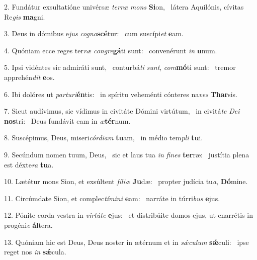 2. Fundátur exsultatióne univérsæ \textit{ter}\textit{ræ} \textit{mons} \textbf{Si}on, \ast\  látera Aquilónis, cívitas Re\textit{gis} \textbf{ma}gni.\

3. Deus in dómibus e\textit{jus} \textit{co}\textit{gno}\textbf{scé}tur: \ast\  cum suscípi\textit{et} \textbf{e}am.\

4. Quóniam ecce reges ter\textit{ræ} \textit{con}\textit{gre}\textbf{gá}ti sunt: \ast\  convenérunt \textit{in} \textbf{u}num.\

5. Ipsi vidéntes sic admiráti sunt, \dag\  conturbá\textit{ti} \textit{sunt}, \textit{com}\textbf{mó}ti sunt: \ast\  tremor apprehén\textit{dit} \textbf{e}os.\

6. Ibi dolóres ut \textit{par}\textit{tu}\textit{ri}\textbf{én}tis: \ast\  in spíritu veheménti cónteres na\textit{ves} \textbf{Thar}sis.\

7. Sicut audívimus, sic vídimus in civitáte Dómini virtútum, \dag\  in civitá\textit{te} \textit{De}\textit{i} \textbf{nos}tri: \ast\  Deus fundávit eam in \textit{æ}\textbf{tér}num.\

8. Suscépimus, Deus, miseri\textit{cór}\textit{di}\textit{am} \textbf{tu}am, \ast\  in médio tem\textit{pli} \textbf{tu}i.\

9. Secúndum nomen tuum, Deus, \dag\  sic et laus tua \textit{in} \textit{fi}\textit{nes} \textbf{ter}ræ: \ast\  justítia plena est déxte\textit{ra} \textbf{tu}a.\

10. Lætétur mons Sion, et exsúltent \textit{fí}\textit{li}\textit{æ} \textbf{Ju}dæ: \ast\  propter judícia tu\textit{a}, \textbf{Dó}mine.\

11. Circúmdate Sion, et complec\textit{tí}\textit{mi}\textit{ni} \textbf{e}am: \ast\  narráte in túrri\textit{bus} \textbf{e}jus.\

12. Pónite corda vestra in \textit{vir}\textit{tú}\textit{te} \textbf{e}jus: \ast\  et distribúite domos ejus, ut enarrétis in progéni\textit{e} \textbf{ál}tera.\

13. Quóniam hic est Deus, Deus noster in ætérnum et in \textit{sǽ}\textit{cu}\textit{lum} \textbf{sǽ}culi: \ast\  ipse reget nos \textit{in} \textbf{sǽ}cula.\

